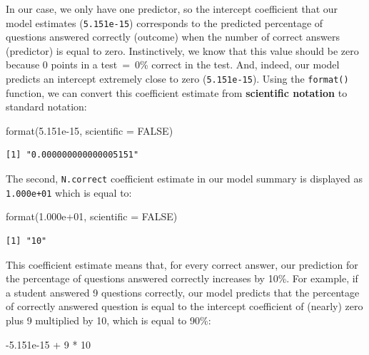 \documentclass[
  letterpaper,
  DIV=11,
  numbers=noendperiod]{scrreprt}
\newenvironment{Shaded}{\begin{snugshade}}{\end{snugshade}}
\newcommand{\AttributeTok}[1]{\textcolor[rgb]{0.40,0.45,0.13}{#1}}
\newcommand{\ConstantTok}[1]{\textcolor[rgb]{0.56,0.35,0.01}{#1}}
\newcommand{\DecValTok}[1]{\textcolor[rgb]{0.68,0.00,0.00}{#1}}
\newcommand{\FloatTok}[1]{\textcolor[rgb]{0.68,0.00,0.00}{#1}}
\newcommand{\FunctionTok}[1]{\textcolor[rgb]{0.28,0.35,0.67}{#1}}
\newcommand{\NormalTok}[1]{\textcolor[rgb]{0.00,0.23,0.31}{#1}}
\newcommand{\SpecialCharTok}[1]{\textcolor[rgb]{0.37,0.37,0.37}{#1}}
\begin{document}
In our case, we only have one predictor, so the intercept coefficient
that our model estimates (\texttt{5.151e-15}) corresponds to the
predicted percentage of questions answered correctly (outcome) when the
number of correct answers (predictor) is equal to zero. Instinctively,
we know that this value should be zero because 0 points in a test~=~0\%
correct in the test. And, indeed, our model predicts an intercept
extremely close to zero (\texttt{5.151e-15}). Using the
\texttt{format()} function, we can convert this coefficient estimate
from \textbf{scientific notation} to standard notation:

\begin{Shaded}
\begin{Highlighting}[]
\FunctionTok{format}\NormalTok{(}\FloatTok{5.151e{-}15}\NormalTok{, }\AttributeTok{scientific =} \ConstantTok{FALSE}\NormalTok{)}
\end{Highlighting}
\end{Shaded}

\begin{verbatim}
[1] "0.000000000000005151"
\end{verbatim}

The second, \texttt{N.correct} coefficient estimate in our model summary
is displayed as \texttt{1.000e+01} which is equal to:

\begin{Shaded}
\begin{Highlighting}[]
\FunctionTok{format}\NormalTok{(}\FloatTok{1.000e+01}\NormalTok{, }\AttributeTok{scientific =} \ConstantTok{FALSE}\NormalTok{)}
\end{Highlighting}
\end{Shaded}

\begin{verbatim}
[1] "10"
\end{verbatim}

This coefficient estimate means that, for every correct answer, our
prediction for the percentage of questions answered correctly increases
by 10\%. For example, if a student answered 9 questions correctly, our
model predicts that the percentage of correctly answered question is
equal to the intercept coefficient of (nearly) zero plus 9 multiplied by
10, which is equal to 90\%:

\begin{Shaded}
\begin{Highlighting}[]
\SpecialCharTok{{-}}\FloatTok{5.151e{-}15} \SpecialCharTok{+} \DecValTok{9} \SpecialCharTok{*} \DecValTok{10}
\end{Highlighting}
\end{Shaded}
\end{document}
